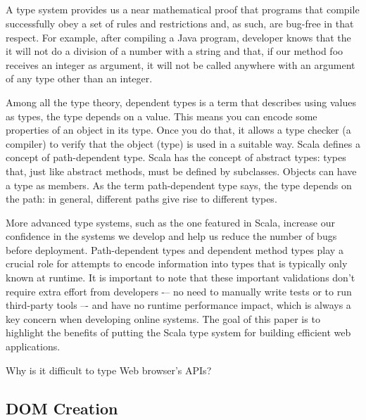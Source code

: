 \documentclass[runningheads,a4paper]{llncs}
\begin{document}
\subsection{}

A type system provides us a near mathematical proof that programs that compile successfully obey a set of rules and
restrictions and, as such, are bug-free in that respect. For example, after compiling a Java program, developer knows
that the it will not do a division of a number with a string and that, if our method foo receives an integer as
argument, it will not be called anywhere with an argument of any type other than an integer.

Among all the type theory,  dependent types is a term that describes using values as types, the type depends on a
value. This means you can encode some properties of an object in its type. Once you do that, it allows a type checker
(a compiler) to verify that the object (type) is used in a suitable way. Scala defines a concept of path-dependent
type. Scala has the concept of abstract types: types that, just like abstract methods, must be defined by
subclasses. Objects can have a type as members. As the term path-dependent type says, the type depends on the path:
in general, different paths give rise to different types. 


More advanced type systems, such as the one featured in Scala, increase our confidence in the systems we develop and
help us reduce the number of bugs before deployment. Path-dependent types and dependent method types play a crucial
role for attempts to encode information into types that is typically only known at runtime. It is important to note
that these important validations don't require extra effort from developers -– no need to manually write tests or to
run third-party tools –- and have no runtime performance impact, which is always a key concern when developing online
systems. The goal of this paper is to highlight the benefits of putting the Scala type system for building efficient
web applications.



Why is it difficult to type Web browser’s APIs?

\subsection{DOM Creation}
\end{document}
